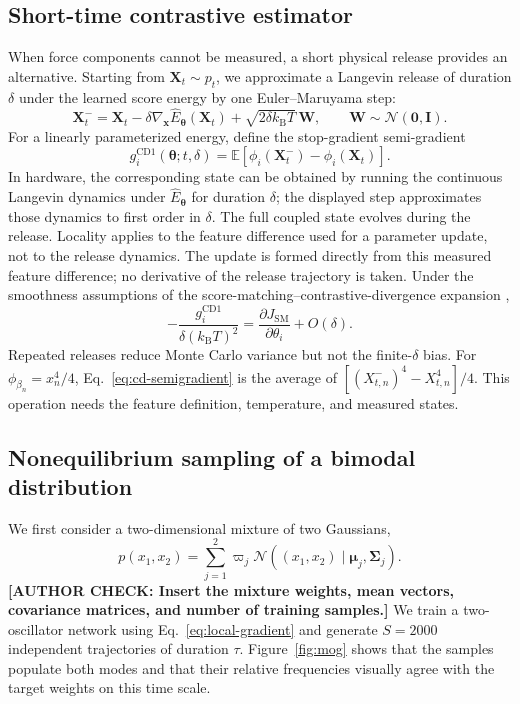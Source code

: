 \documentclass[referee,lineno,pdflatex,sn-nature]{sn-jnl}
\newcommand{\kBT}{k_{\mathrm B}T}
\newcommand{\vect}[1]{\boldsymbol{#1}}
\newcommand{\Ehat}{\widehat E}
\newcommand{\authorcheck}[1]{\textbf{[AUTHOR CHECK: #1]}}
\begin{document}
\subsection{Short-time contrastive estimator}

When force components cannot be measured, a short physical release provides an
alternative. Starting from $\vect X_t\sim p_t$, we approximate a Langevin release
of duration $\delta$ under the learned score energy by one Euler--Maruyama step:
\begin{equation}\label{eq:cd-release}
 \vect X_t^- =\vect X_t-\delta\nabla_{\vect x}\Ehat_{\vect\theta}(\vect X_t)
 +\sqrt{2\delta\kBT}\,\vect W,
 \qquad \vect W\sim\mathcal N(\vect0,\vect I).
\end{equation}
For a linearly parameterized energy, define the stop-gradient semi-gradient
\begin{equation}\label{eq:cd-semigradient}
 g_i^{\mathrm{CD1}}(\vect\theta;t,\delta)
 =\mathbb E\left[\phi_i(\vect X_t^-)-\phi_i(\vect X_t)\right].
\end{equation}
In hardware, the corresponding state can be obtained by running the continuous
Langevin dynamics under $\Ehat_{\vect\theta}$ for duration $\delta$; the displayed
step approximates those dynamics to first order in $\delta$. The full coupled state
evolves during the release. Locality applies to the feature difference used for a
parameter update, not to the release dynamics. The update is formed directly from
this measured feature difference; no derivative of the release trajectory is
taken. Under the smoothness assumptions of the
score-matching--contrastive-divergence expansion \cite{hyvarinen2007connections},
\begin{equation}\label{eq:cd-limit}
 -\frac{g_i^{\mathrm{CD1}}}{\delta(\kBT)^2}
 =\frac{\partial J_{\mathrm{SM}}}{\partial\theta_i}+O(\delta).
\end{equation}
Repeated releases reduce Monte Carlo variance but not the finite-$\delta$ bias. For
$\phi_{\beta_n}=x_n^4/4$, Eq.~\eqref{eq:cd-semigradient} is the average of
$[(X_{t,n}^-)^4-X_{t,n}^4]/4$. This operation needs the feature definition,
temperature, and measured states.


\subsection{Nonequilibrium sampling of a bimodal distribution}

We first consider a two-dimensional mixture of two Gaussians,
\begin{equation}
 p(x_1,x_2)=\sum_{j=1}^{2}\varpi_j
 \mathcal N\!\left((x_1,x_2)\mid\vect\mu_j,\vect\Sigma_j\right).
\end{equation}
\authorcheck{Insert the mixture weights, mean vectors, covariance matrices, and
number of training samples.}
We train a two-oscillator network using Eq.~\eqref{eq:local-gradient} and generate
$S=2000$ independent trajectories of duration $\tau$. Figure~\ref{fig:mog}
shows that the samples populate both modes and that their relative frequencies
visually agree with the target weights on this time scale.
\end{document}
